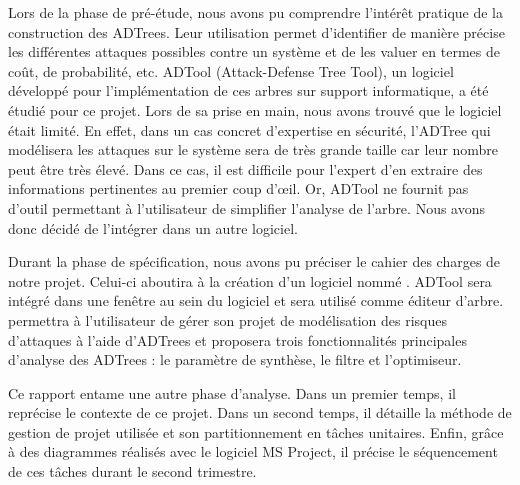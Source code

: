 Lors de la phase de pré-étude, nous avons pu comprendre l’intérêt pratique de la construction des ADTrees. Leur utilisation permet d'identifier de manière précise les différentes attaques possibles contre un système et de les valuer en termes de coût, de probabilité, etc. ADTool (Attack-Defense Tree Tool), un logiciel développé pour l'implémentation de ces arbres sur support informatique, a été étudié pour ce projet. Lors de sa prise en main, nous avons trouvé que le logiciel était limité. En effet, dans un cas concret d'expertise en sécurité, l'ADTree qui modélisera les attaques sur le système sera de très grande taille car leur nombre peut être très élevé. Dans ce cas, il est difficile pour l'expert d'en extraire des informations pertinentes au premier coup d’œil. Or, ADTool ne fournit pas d'outil permettant à l'utilisateur de simplifier l'analyse de l'arbre. Nous avons donc décidé de l'intégrer dans un autre logiciel.

Durant la phase de spécification, nous avons pu préciser le cahier des charges de notre projet. Celui-ci aboutira à la création d'un logiciel nommé \glasir{}. ADTool sera intégré dans une fenêtre au sein du logiciel et sera utilisé comme éditeur d'arbre. \glasir{} permettra à l'utilisateur de gérer son projet de modélisation des risques d'attaques à l'aide d'ADTrees et proposera trois fonctionnalités principales d'analyse des ADTrees : le paramètre de synthèse, le filtre et l'optimiseur.

Ce rapport entame une autre phase d'analyse. Dans un premier temps, il reprécise le contexte de ce projet. Dans un second temps, il détaille la méthode de gestion de projet utilisée et son partitionnement en tâches unitaires. Enfin, grâce à des diagrammes réalisés avec le logiciel MS Project, il précise le séquencement de ces tâches durant le second trimestre.